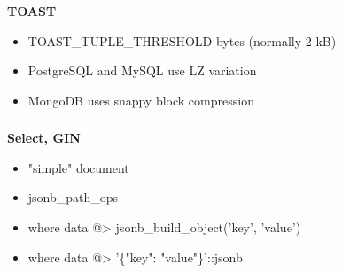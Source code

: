 \documentclass[usenames,dvipsnames, 18pt, compress, aspectratio=169]{beamer}
\begin{document}
\fontsize{14pt}{16}\selectfont
\begin{frame}
    \frametitle{}
    \begin{center}
    \textbf{TOAST}
    \vspace{20pt}


    \vspace{20pt}
    \begin{itemize}[label={\MVRightarrow}]
        \item TOAST\_TUPLE\_THRESHOLD bytes (normally 2 kB)
        \item PostgreSQL and MySQL use LZ variation
        \item MongoDB uses snappy block compression
    \end{itemize}

    \end{center}
\end{frame}

\begin{frame}
    \frametitle{}
    \begin{center}
        \textbf{Select, GIN}
        \begin{itemize}[label={}]
            \item "simple" document
            \item jsonb\_path\_ops
            \item where data @> jsonb\_build\_object('key', 'value')
            \item where data @> '\{"key": "value"\}'::jsonb
        \end{itemize}
    \end{center}
\end{frame}
\end{document}
